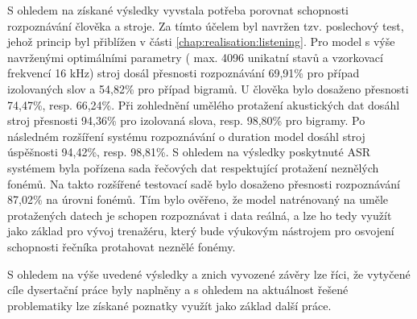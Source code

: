 S ohledem na získané výsledky vyvstala potřeba porovnat schopnosti rozpoznávání člověka a stroje. Za tímto účelem byl navržen tzv. poslechový test, jehož princip byl přiblížen v části \ref{chap:realisation:listening}. Pro model s výše navrženými optimálními parametry ( max. 4096 unikatní stavů a vzorkovací frekvencí 16 kHz) stroj dosál přesnosti rozpoznávání  69,91\% pro případ izolovaných slov a 54,82\% pro případ bigramů. U člověka bylo dosaženo přesnosti 74,47\%, resp. 66,24\%. Při zohlednění umělého protažení akustických dat dosáhl stroj přesnosti 94,36\% pro izolovaná slova, resp. 98,80\% pro bigramy. Po následném rozšíření systému rozpoznávání o duration model dosáhl stroj úspěšnosti 94,42\%, resp. 98,81\%. S ohledem na výsledky poskytnuté ASR systémem byla pořízena sada řečových dat respektující protažení neznělých fonémů. Na takto rozšířené testovací sadě bylo dosaženo přesnosti rozpoznávání 87,02\% na úrovni fonémů. Tím bylo ověřeno, že model natrénovaný na uměle protažených datech je schopen rozpoznávat i data reálná, a lze ho tedy využít jako základ pro vývoj trenažéru, který bude výukovým nástrojem pro osvojení schopnosti řečníka protahovat neznělé fonémy.

S ohledem na výše uvedené výsledky a znich vyvozené závěry lze říci, že vytyčené cíle dysertační práce byly naplněny a s ohledem na aktuálnost řešené problematiky lze získané poznatky využít jako základ další práce.










